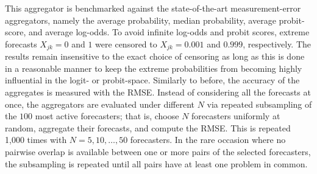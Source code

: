 \documentclass[11pt]{article}
\theoremstyle{definition}
\theoremstyle{definition}
\def\one{{\bf 1}}
\begin{document}
This aggregator is benchmarked against the state-of-the-art measurement-error aggregators, namely the average probability, median probability, average probit-score, and average log-odds. To avoid infinite log-odds
and probit scores, extreme forecasts $X_{jk} = 0$ and $1$ were
censored to $X_{jk} = 0.001$ and $0.999$, respectively. The results remain insensitive to the exact choice of censoring as long as this is done in a reasonable manner to keep the extreme probabilities from becoming highly influential in the logit- or probit-space. Similarly to before, the accuracy of the aggregates is measured with the RMSE.
 Instead of considering all the forecasts at once, the aggregators are evaluated under different $N$ via repeated subsampling of the $100$ most active forecasters; that is, choose $N$ forecasters uniformly at random, aggregate their forecasts, and compute the RMSE. This is repeated 1,000 times with $N = 5, 10, \dots, 50$ forecasters. In the rare occasion where no pairwise overlap is available between one or more pairs of the selected forecasters, the subsampling is repeated until all pairs have at least one problem in common. 
\end{document}
